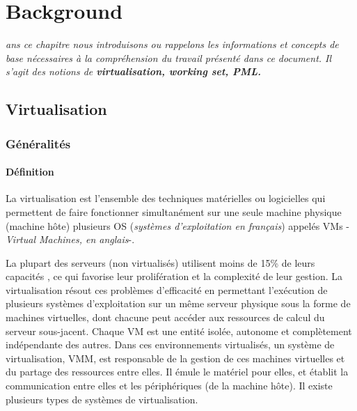 \let\textcircled=\pgftextcircled
\chapter{Background}
\label{chap:background}

\textit{ans ce chapitre nous introduisons ou rappelons les informations et concepts de base nécessaires à la compréhension du travail présenté dans ce document. Il s'agit des notions de \textbf{virtualisation, working set, PML.}}\\
\par

\minitoc

\newpage    
\section{Virtualisation}

\subsection{Généralités}

\subsubsection{Définition}
\par\noindent La virtualisation est l’ensemble des techniques matérielles ou logicielles qui permettent de faire fonctionner simultanément sur une seule machine physique (machine hôte) plusieurs \ac{OS} (\textit{systèmes d’exploitation en français}) appelés \ac{VMs} -\textit{Virtual Machines, en anglais}-.\\

\par\noindent La plupart des serveurs (non virtualisés) utilisent moins de 15\% de leurs capacités \cite{online1}, ce qui favorise leur prolifération et la complexité de leur gestion. La virtualisation résout ces problèmes d’efficacité en permettant l'exécution de plusieurs systèmes d’exploitation sur un même serveur physique sous la forme de machines virtuelles, dont chacune peut accéder aux ressources de calcul du serveur sous-jacent. Chaque VM est une entité isolée, autonome et complètement indépendante des autres. Dans ces environnements virtualisés, un système de virtualisation, \ac{VMM}, est responsable de la gestion de ces machines virtuelles et du partage des ressources entre elles. Il émule le matériel pour elles, et établit la communication entre elles et les périphériques (de la machine hôte). Il existe plusieurs types de systèmes de virtualisation.

